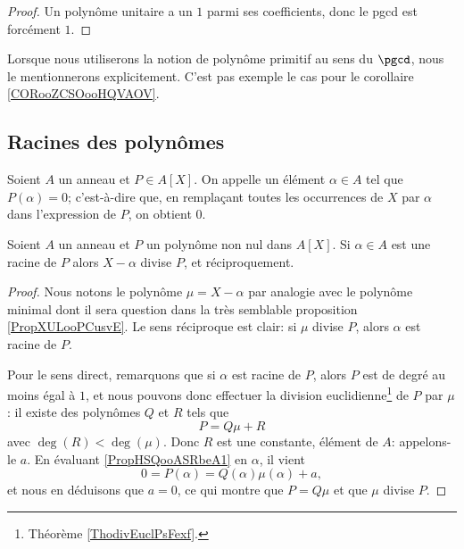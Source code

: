 \begin{proof}
    Un polynôme unitaire a un \( 1\) parmi ses coefficients, donc le pgcd est forcément \( 1\). 
\end{proof}

Lorsque nous utiliserons la notion de polynôme primitif au sens du \( \pgcd\), nous le mentionnerons explicitement. C'est pas exemple le cas pour le corollaire \ref{CORooZCSOooHQVAOV}.

\subsection{Racines des polynômes}

\begin{definition}
  Soient \( A \) un anneau et \( P \in A[X] \). On appelle
   un élément \( \alpha \in A \)
  tel que \( P(\alpha) = 0 \); c'est-à-dire que, en remplaçant toutes
  les occurrences de $X$ par $\alpha$ dans l'expression de $P$, on
  obtient $0$.
\end{definition}

\begin{proposition} \label{PropHSQooASRbeA}
    Soient \( A\) un anneau et \( P\) un polynôme non nul dans \( A[X]\). Si \( \alpha\in A\) est une racine de \( P\) alors \( X-\alpha\) divise \( P\), et réciproquement.
\end{proposition}

\begin{proof}
  Nous notons le polynôme \( \mu=X-\alpha\) par analogie avec le polynôme minimal dont il sera question dans la très semblable proposition \ref{PropXULooPCusvE}. Le sens réciproque est clair: si $\mu$ divise $P$, alors $\alpha$ est racine de $P$.

  Pour le sens direct, remarquons que si $\alpha$ est racine de $P$, alors $P$ est de degré au moins égal à \( 1\), et nous pouvons donc effectuer la division euclidienne\footnote{Théorème \ref{ThodivEuclPsFexf}.} de \( P\) par \( \mu\) : il existe des polynômes \( Q\) et \( R\) tels que
    \begin{equation} \label{PropHSQooASRbeA1}
        P=Q\mu+R
    \end{equation}
    avec \( \deg(R)<\deg(\mu)\). Donc \( R\) est une constante,
    élément de $A$: appelons-le $a$. En évaluant
    \eqref{PropHSQooASRbeA1} en \( \alpha\), il vient
    \begin{equation}
        0 = P(\alpha)=Q(\alpha)\mu(\alpha)+a,
    \end{equation}
    et nous en déduisons que \( a=0\), ce qui montre que \( P=Q\mu\) et que \( \mu\) divise \( P\).
\end{proof}

